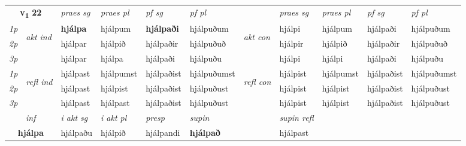 \noindent
\begin{tabular}{lllllllllll} \toprule
\multicolumn{2}{c}{\textbf{v{\textsubscript{1}}} \Large{\textbf{22}}}  &  \textit{praes sg}  & \textit{praes pl}  &\textit{ pf sg} & \textit{pf pl} &  &  \textit{praes sg}  & \textit{praes pl}  & \textit{pf sg} & \textit{pf pl } \\*
	\cmidrule{3-6} \cmidrule{8-11}
 {\textit{1p}} & \multirow{3}{*}{\begin{turn}{90}\textit{akt ind}\end{turn}} & \textbf{hjálpa} & hjálpum & \textbf{hjálpaði} & hjálpuðum & \multirow{3}{*}{\begin{turn}{90}\textit{akt con}\end{turn}} &hjálpi & hjálpum & hjálpaði & hjálpuðum\\*
 {\textit{2p}} &  &  hjálpar  & hjálpið & hjálpaðir & hjálpuðuð & & hjálpir & hjálpið & hjálpaðir & hjálpuðuð \\*
{\textit{3p}} &  & hjálpar & hjálpa & hjálpaði & hjálpuðu & & hjálpi & hjálpi& hjálpaði & hjálpuðu \\*
\cmidrule{3-6} \cmidrule{8-11}
 {\textit{1p}} & \multirow{3}{*}{\begin{turn}{90}\textit{refl ind}\end{turn}}  & hjálpast & hjálpumst & hjálpaðist & hjálpuðumst & \multirow{3}{*}{\begin{turn}{90}\textit{refl con}\end{turn}}  &hjálpist & hjálpumst & hjálpaðist & hjálpuðumst \\*
 {\textit{2p}} &  & hjálpast & hjálpist & hjálpaðist & hjálpuðust & &hjálpist & hjálpist & hjálpaðist & hjálpuðust \\*
 {\textit{3p}}  & & hjálpast & hjálpast & hjálpaðist & hjálpuðust & & hjálpist & hjálpist& hjálpaðist & hjálpuðust \\*
\cmidrule{3-6} \cmidrule{8-11}

   \multicolumn{2}{c}{\textit{inf}}  & \textit{i akt sg} & \textit{i akt pl}   & \textit{presp} & \textit{supin} && \textit{supin refl}  \\*
  \multicolumn{2}{c}{\textbf{hjálpa}} & hjálpaðu  & hjálpið   & hjálpandi &  \textbf{hjálpað} && hjálpast  \\*
\end{tabular}


